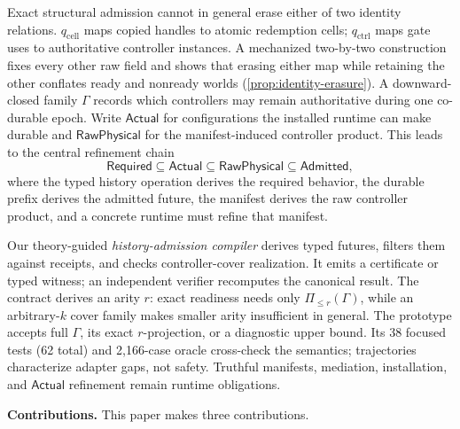 Exact structural admission cannot in general erase either of two identity
relations.
$q_{\mathrm{cell}}$ maps copied handles to atomic redemption cells;
$q_{\mathrm{ctrl}}$ maps gate uses to authoritative controller instances.  A
mechanized two-by-two construction fixes every other raw field and shows that
erasing either map while retaining the other conflates ready and nonready
worlds (\cref{prop:identity-erasure}).  A
downward-closed family $\Gamma$ records which controllers may remain
authoritative during one co-durable epoch.  Write
$\mathsf{Actual}$ for configurations the installed runtime can make durable and
$\mathsf{RawPhysical}$ for the manifest-induced controller product.  This leads
to the central refinement chain
\[
  \mathsf{Required}\subseteq\mathsf{Actual}
  \subseteq\mathsf{RawPhysical}\subseteq\mathsf{Admitted},
\]
where the typed history operation derives the required behavior, the durable
prefix derives the admitted future, the manifest derives the raw controller
product, and a concrete runtime must refine that manifest.

Our theory-guided \emph{history-admission compiler} derives typed futures,
filters them against receipts, and checks controller-cover realization.  It
emits a certificate or typed witness; an independent verifier recomputes the
canonical result.  The contract derives an arity $r$: exact readiness needs
only $\Pi_{\leq r}(\Gamma)$, while an arbitrary-$k$ cover family makes smaller
arity insufficient in general.  The prototype accepts full $\Gamma$, its exact
$r$-projection, or a diagnostic upper bound.  Its 38 focused tests (62 total)
and 2,166-case oracle cross-check the semantics; trajectories characterize
adapter gaps, not safety.  Truthful manifests, mediation, installation, and
$\mathsf{Actual}$ refinement remain runtime obligations.

\noindent\textbf{Contributions.}
This paper makes three contributions.
\nopagebreak[4]

